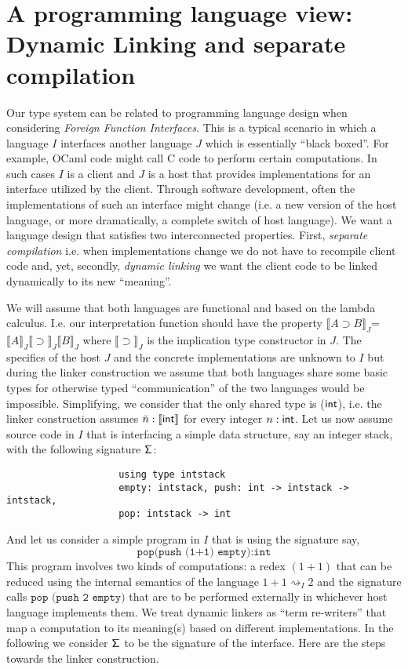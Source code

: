 					\section{A programming language view: Dynamic Linking and separate compilation}
					\label{dlinker}
					Our type system can be related to programming language design when considering \textit{Foreign Function Interfaces}. This is a typical scenario in which a language $I$ interfaces another language $J$ which is  essentially ``black boxed''.
					For example, {\sf OCaml} code  might call {\sf C} code to perform certain computations. 
					In such cases $I$ is a client and $J$ is a host that provides implementations for an interface utilized by the client.
					Through software development,  often the implementations of such an interface might change (i.e. a new version of the host language, or more dramatically, a complete switch of host language). 
					We want a language design that satisfies
					two  interconnected 
					properties. First, \textit{separate compilation} i.e. when implementations change we do not have to recompile client code and, yet, 
					secondly, \textit{dynamic linking} we want the client code to be linked dynamically to its new 
					``meaning''.
					
					We will assume that both languages are  functional and based on the lambda calculus. I.e. our interpretation function should have the property $\llbracket A\supset B\rrbracket_J$=
					$\llbracket A\rrbracket_J \llbracket\supset\rrbracket_J \llbracket B\rrbracket_J$ where  $\llbracket\supset\rrbracket_J$ is the implication type constructor in $J$.
					The specifics of the host  $J$ and the concrete implementations are unknown to $I$ but during the linker construction we assume that both languages share  some  basic types
					for otherwise  typed ``communication'' of the two languages would be impossible. 
					Simplifying,  we consider that the only  shared type is  (${\sf int}$), i.e. the linker construction assumes  
					$\bar{n}:\llbracket \sf int \rrbracket$ for every integer $n:{\sf int}$. 
					Let us now assume source code in $I$ that
					is  interfacing   a simple data structure, say an  integer stack,  with the following signature ${\sf \Sigma}$:
					\begin{lstlisting} 
					using type intstack
					empty: intstack, push: int -> intstack -> intstack,
					pop: intstack -> int
					\end{lstlisting}
					
					
					And let us consider a simple program in $I$ that is using the signature say, 
					$${\texttt{pop(push (1+1) empty):int}}$$
					This program involves two kinds of computations: a redex $(1+1)$ that can be reduced using the internal semantics of the language $1+1\rightsquigarrow_{I} 2$ and  
					the signature calls ${{\texttt{pop (push 2 empty)}}}$ 
					that are to be performed
					externally  in whichever host language implements them. 
					We treat  dynamic linkers as ``term re-writers'' that map  a computation to its meaning(s) based on different implementations.
					In the following we consider ${\sf \Sigma}$ to be the signature of the interface. Here are the steps towards the linker construction.
					
